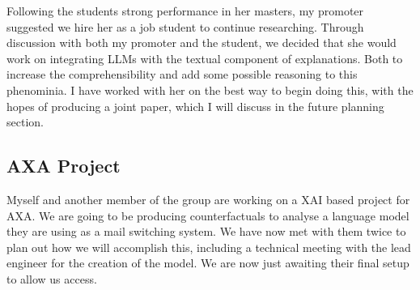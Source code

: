 Following the students strong performance in her masters, my promoter suggested we hire her as a job student to continue researching. Through discussion with both my promoter and the student, we decided that she would work on integrating LLMs with the textual component of explanations. Both to increase the comprehensibility and add some possible reasoning to this phenominia.
I have worked with her on the best way to begin doing this, with the hopes of producing a joint paper, which I will discuss in the future planning section.

\subsection{AXA Project}

Myself and another member of the group are working on a XAI based project for AXA. We are going to be producing counterfactuals to analyse a language model they are using as a mail switching system. We have now met with them twice to plan out how we will accomplish this, including a technical meeting with the lead engineer for the creation of the model. We are now just awaiting their final setup to allow us access.


